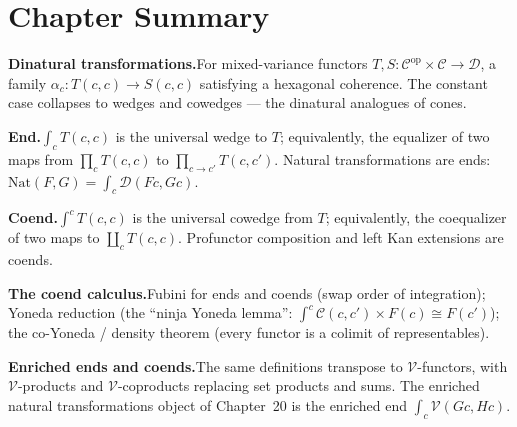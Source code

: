 \begin{exercisesbox}
\begin{qa}
\end{qa}
\end{exercisesbox}


\section*{Chapter Summary}

\begin{summarybox}
\textbf{Dinatural transformations.}\quad For mixed-variance functors $T, S :
\mathcal{C}^{\mathrm{op}} \times \mathcal{C} \to \mathcal{D}$, a family
$\alpha_c : T(c,c) \to S(c,c)$ satisfying a hexagonal coherence. The constant
case collapses to wedges and cowedges — the dinatural analogues of cones.

\textbf{End.}\quad $\int_c T(c, c)$ is the universal wedge to $T$; equivalently,
the equalizer of two maps from $\prod_c T(c, c)$ to $\prod_{c \to c'} T(c, c')$.
Natural transformations are ends: $\mathrm{Nat}(F, G) = \int_c \mathcal{D}(Fc, Gc)$.

\textbf{Coend.}\quad $\int^c T(c, c)$ is the universal cowedge from $T$;
equivalently, the coequalizer of two maps to $\coprod_c T(c, c)$. Profunctor
composition and left Kan extensions are coends.

\textbf{The coend calculus.}\quad Fubini for ends and coends (swap order of
integration); Yoneda reduction (the ``ninja Yoneda lemma'':
$\int^c \mathcal{C}(c, c') \times F(c) \cong F(c')$); the co-Yoneda /
density theorem (every functor is a colimit of representables).

\textbf{Enriched ends and coends.}\quad The same definitions transpose to
$\mathcal{V}$-functors, with $\mathcal{V}$-products and $\mathcal{V}$-coproducts
replacing set products and sums. The enriched natural transformations object
of Chapter~20 is the enriched end $\int_c \mathcal{V}(Gc, Hc)$.
\end{summarybox}


